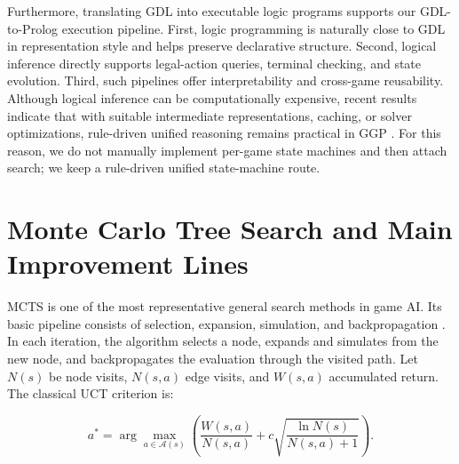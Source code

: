 Furthermore, translating GDL into executable logic programs supports our GDL-to-Prolog execution pipeline. First, logic programming is naturally close to GDL in representation style and helps preserve declarative structure. Second, logical inference directly supports legal-action queries, terminal checking, and state evolution. Third, such pipelines offer interpretability and cross-game reusability. Although logical inference can be computationally expensive, recent results indicate that with suitable intermediate representations, caching, or solver optimizations, rule-driven unified reasoning remains practical in GGP \cite{he2024qbf}. For this reason, we do not manually implement per-game state machines and then attach search; we keep a rule-driven unified state-machine route.


\section{Monte Carlo Tree Search and Main Improvement Lines}


MCTS is one of the most representative general search methods in game AI. Its basic pipeline consists of selection, expansion, simulation, and backpropagation \cite{browne2012survey}. In each iteration, the algorithm selects a node, expands and simulates from the new node, and backpropagates the evaluation through the visited path. Let $N(s)$ be node visits, $N(s,a)$ edge visits, and $W(s,a)$ accumulated return. The classical UCT criterion is:


\begin{equation}
a^\ast=\arg\max_{a\in\mathcal{A}(s)}
\left(
\frac{W(s,a)}{N(s,a)}
+
c\sqrt{\frac{\ln N(s)}{N(s,a)+1}}
\right).
\end{equation}


